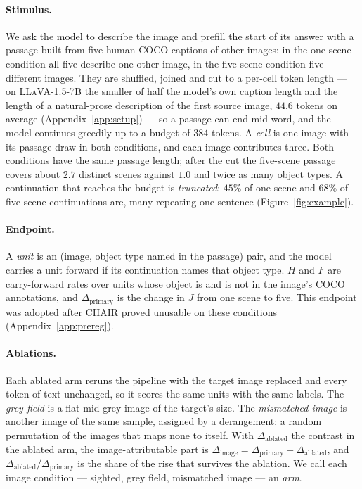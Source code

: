 \documentclass{article} %
\newcommand{\dSight}{\ensuremath{\Delta_{\mathrm{image}}}}
\newcommand{\dBlind}{\ensuremath{\Delta_{\mathrm{ablated}}}}
\newcommand{\dPrim}{\ensuremath{\Delta_{\mathrm{primary}}}}
\begin{document}
\paragraph{Stimulus.} We ask the model to describe the image and prefill the start of its answer with a
passage built from five human COCO captions of other images: in the one-scene condition all five
describe one other image, in the five-scene condition five different images. They are shuffled, joined
and cut to a per-cell token length --- on \textsc{LLaVA-1.5-7B} the smaller of half the model's own
caption length and the length of a natural-prose description of the first source image, $44.6$ tokens
on average (Appendix~\ref{app:setup}) --- so a passage can end mid-word, and the model continues
greedily up to a budget of $384$ tokens. A \emph{cell} is one image with its passage draw in both
conditions, and each image contributes three. Both conditions have the same passage length; after the
cut the five-scene passage covers about $2.7$ distinct scenes against $1.0$ and twice as many object
types. A continuation that reaches the budget is \emph{truncated}: $45\%$ of one-scene and $68\%$ of
five-scene continuations are, many repeating one sentence (Figure~\ref{fig:example}).

\paragraph{Endpoint.} A \emph{unit} is an (image, object type named in the passage) pair, and the model
carries a unit forward if its continuation names that object type. $H$ and $F$ are carry-forward rates
over units whose object is and is not in the image's COCO annotations, and $\dPrim$ is the change in
$J$ from one scene to five. This endpoint was adopted after CHAIR proved unusable on these conditions
(Appendix~\ref{app:prereg}).

\paragraph{Ablations.} Each ablated arm reruns the pipeline with the target image replaced and every
token of text unchanged, so it scores the same units with the same labels. The \emph{grey field} is a
flat mid-grey image of the target's size. The \emph{mismatched image} is another image of the same
sample, assigned by a derangement: a random permutation of the images that maps none to itself. With
$\dBlind$ the contrast in the ablated arm, the image-attributable part is $\dSight = \dPrim - \dBlind$,
and $\dBlind/\dPrim$ is the share of the rise that survives the ablation. We call each image condition --- sighted, grey
field, mismatched image --- an \emph{arm}.
\end{document}
